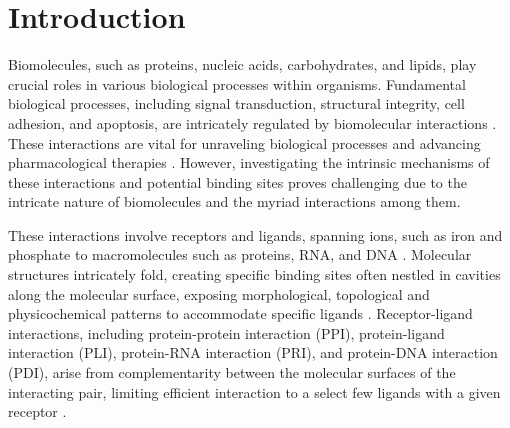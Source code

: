 \documentclass[Ingles]{phdthesis}
\begin{document}
\clearpage



\tableofcontents

\fimdaspaginasiniciais



\chapter{Introduction}

Biomolecules, such as proteins, nucleic acids, carbohydrates, and lipids, play crucial roles in various biological processes within organisms. Fundamental biological processes, including signal transduction, structural integrity, cell adhesion, and apoptosis, are intricately regulated by biomolecular interactions \cite{sotriffer2002,henrich2010,kozlikova2016}. These interactions are vital for unraveling biological processes and advancing pharmacological therapies \cite{henrich2010}. However, investigating the intrinsic mechanisms of these interactions and potential binding sites proves challenging due to the intricate nature of biomolecules and the myriad interactions among them.

These interactions involve receptors and ligands, spanning ions, such as iron and phosphate to macromolecules such as proteins, RNA, and DNA \cite{oliveira2014}. Molecular structures intricately fold, creating specific binding sites often nestled in cavities along the molecular surface, exposing morphological, topological and physicochemical patterns to accommodate specific ligands \cite{henrich2010,guerra2021}. Receptor-ligand interactions, including protein-protein interaction (PPI), protein-ligand interaction (PLI), protein-RNA interaction (PRI), and protein-DNA interaction (PDI), arise from complementarity between the molecular surfaces of the interacting pair, limiting efficient interaction to a select few ligands with a given receptor \cite{henrich2010,simoes2017}.
\end{document}
